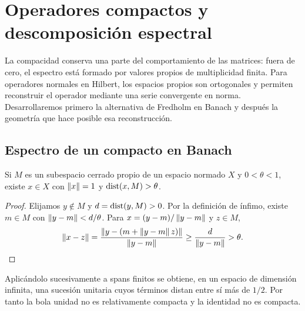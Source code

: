 \chapter{Operadores compactos y descomposición espectral}\label{cap:v3-06}
La compacidad conserva una parte del comportamiento de las matrices: fuera de cero, el espectro está formado por valores propios de multiplicidad finita. Para operadores normales en Hilbert, los espacios propios son ortogonales y permiten reconstruir el operador mediante una serie convergente en norma. Desarrollaremos primero la alternativa de Fredholm en Banach y después la geometría que hace posible esa reconstrucción.

\section{Espectro de un compacto en Banach}\label{lec:v3-10}
\begin{lema}[Riesz]\label{v3:riesz-lema}
Si $M$ es un subespacio cerrado propio de un espacio normado $X$ y $0<\theta<1$, existe $x\in X$ con $\left\lVert x\right\rVert=1$ y $\operatorname{dist}(x,M)>\theta$.
\end{lema}
\begin{proof}
Elijamos $y\notin M$ y $d=\operatorname{dist}(y,M)>0$. Por la definición de ínfimo, existe $m\in M$ con $\left\lVert y-m\right\rVert<d/\theta$. Para $x=(y-m)/\left\lVert y-m\right\rVert$ y $z\in M$,
\[\left\lVert x-z\right\rVert=\frac{\left\lVert y-(m+\left\lVert y-m\right\rVert z)\right\rVert}{\left\lVert y-m\right\rVert}
\ge\frac d{\left\lVert y-m\right\rVert}>\theta.
\]
\end{proof}
Aplicándolo sucesivamente a spans finitos se obtiene, en un espacio de dimensión infinita, una sucesión unitaria cuyos términos distan entre sí más de $1/2$. Por tanto la bola unidad no es relativamente compacta y la identidad no es compacta.

